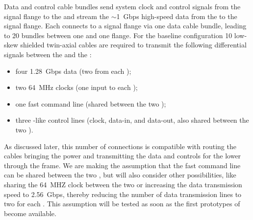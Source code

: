 Data and control cable bundles send system clock and control signals 
from the signal flange to the  and stream the $\sim$\SI{1}{Gbps} 
high-speed data from the  to the signal flange. Each 
 connects to a signal flange via one data cable bundle, 
leading to \num{20} bundles between one  and one flange. 
For the baseline  configuration \num{10} low-skew shielded 
twin-axial cables are required to transmit the following differential signals
between the  and the :
\begin{itemize}
\item four \SI{1.28}{Gbps} data (two from each );
\item two \SI{64}{MHz} clocks (one input to each );
\item one fast command line (shared between the two  );
\item three -like control lines (clock, data-in, and data-out, also shared between the 
two  ).
\end{itemize}
As discussed later, this number of connections is compatible with routing
the cables bringing the power and transmitting the data and controls for
the lower  through the  frame. We are making the
assumption that the fast command line can be shared between the two 
 , but will also consider other possibilities,
like sharing the \SI{64}{MHZ} clock between the two  or
increasing the data transmission speed to \SI{2.56}{Gbps}, thereby
reducing the number of data transmission lines to two for each .
This assumption will be tested as soon as the first prototypes of
 become available.

